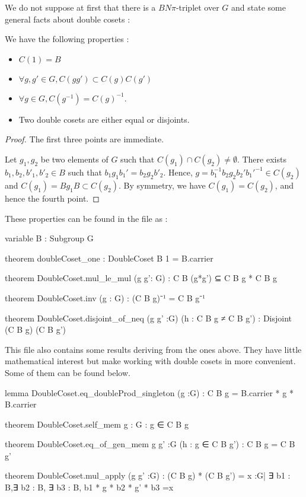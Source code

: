 We do not suppose at first that there is a $BN\pi$-triplet over $G$ and state some general facts about double cosets : 

\begin{proprietes} \label{prop:DC1}
    We have the following properties :
    \begin{itemize}
        \item  $C\left( 1 \right) = B$
        \item $\forall g,g'\in G,C\left( g g' \right) \subset C(g) C(g')$
        \item $\forall g \in G, C\left( g^{-1} \right) = C\left( g \right)^{-1}$.
        \item Two double cosets are either equal or disjoints.
    \end{itemize}
\end{proprietes}

\begin{proof}
    The first three points are immediate. 

    Let $g_1, g_2$ be two elements of $G$ such that $C\left( g_1 \right) \cap C\left( g_2 \right) \neq \emptyset$. There exists $b_1, b_2, b'_1, b'_2 \in B$ such that $b_1 g_1 b_1' = b_2 g_2 b'_2 $. Hence, $g = b_1^{-1} b_2 g_2 b_2' b_1'^{-1} \in  C\left( g_2 \right) $ and $C(g_1) = Bg_1B\subset C(g_2)$. By symmetry, we have $C\left( g_1 \right) = C\left( g_2 \right)$, and hence the fourth point.
\end{proof} 

These properties can be found in the  file as :
\begin{leancode}
variable {B : Subgroup G}

theorem doubleCoset_one : DoubleCoset B 1 = B.carrier

theorem DoubleCoset.mul_le_mul (g g': G) : C B (g*g') ⊆ C B g * C B g

theorem DoubleCoset.inv (g : G) : (C B g)⁻¹ = C B g⁻¹

theorem DoubleCoset.disjoint_of_neq (g g' :G) (h : C B g ≠ C B g') : 
  Disjoint (C B g) (C B g') 
\end{leancode}

This file also contains some results deriving from the ones above. They have little mathematical interest but make working with double cosets in \Lean more convenient. Some of them can be found below.

\begin{leancode}
lemma DoubleCoset.eq_doubleProd_singleton (g :G) : C B g = B.carrier * {g} * B.carrier

theorem DoubleCoset.self_mem {g : G} : g ∈ C B g

theorem DoubleCoset.eq_of_gen_mem {g g' :G} (h : g ∈ C B g') : C B g = C B g'

theorem DoubleCoset.mul_apply (g g' :G) :
  (C B g) * (C B g') = {x :G| ∃ b1 : B,∃ b2 : B, ∃ b3 : B, b1 * g * b2 * g' * b3 =x}
\end{leancode}

